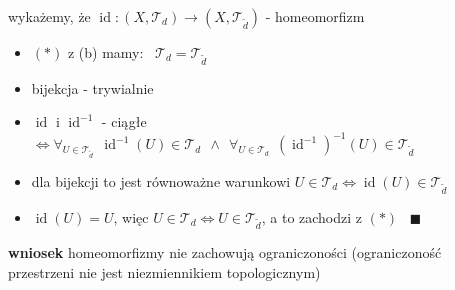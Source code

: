 \documentclass[a4paper,12pt]{article}
\begin{document}
\smallskip
wykażemy, że \(\operatorname{id}: (X, \mathcal{T}_d) \to (X, \mathcal{T}_{\tilde{d}})\) - homeomorfizm
\begin{itemize}
    \item \((*)\) \; z (b) mamy: \, \(\mathcal{T}_d = \mathcal{T}_{\tilde{d}}\)
    \item bijekcja - trywialnie
    \item \(\operatorname{id}\) i \(\operatorname{id}^{-1}\) - ciągłe \(\iff \forall_{U \in \mathcal{T}_{\tilde{d}}} \;\, \operatorname{id}^{-1}(U) \in \mathcal{T}_d \;\, \land \;\, \forall_{U \in \mathcal{T}_d} \;\, (\operatorname{id}^{-1})^{-1}(U) \in \mathcal{T}_{\tilde{d}}\)
    \item dla bijekcji to jest równoważne warunkowi \(U \in \mathcal{T}_d \iff \operatorname{id}(U) \in \mathcal{T}_{\tilde{d}}\)
    \item \(\operatorname{id}(U) = U\), więc \(U \in \mathcal{T}_d \iff U \in \mathcal{T}_{\tilde{d}}\), a to zachodzi z \((*)\) \, \(\blacksquare\)
\end{itemize}

\bigskip
\textbf{wniosek} \; homeomorfizmy nie zachowują ograniczoności  (ograniczoność przestrzeni nie jest niezmiennikiem topologicznym)
\end{document}
